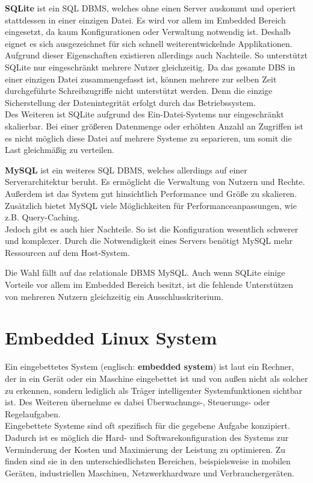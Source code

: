 \textbf{SQLite} ist ein \ac{SQL} \ac{DBMS}, welches ohne einen Server auskommt und operiert stattdessen in einer einzigen Datei. Es wird vor allem im Embedded Bereich eingesetzt, da kaum Konfigurationen oder Verwaltung notwendig ist. Deshalb eignet es sich ausgezeichnet für sich schnell weiterentwickelnde Applikationen.
\\
Aufgrund dieser Eigenschaften existieren allerdings auch Nachteile. So unterstützt SQLite nur eingeschränkt mehrere Nutzer gleichzeitig. Da das gesamte \ac{DBS} in einer einzigen Datei zusammengefasst ist, können mehrere zur selben Zeit durchgeführte Schreibzugriffe nicht unterstützt werden. Denn die einzige Sicherstellung der Datenintegrität erfolgt durch das Betriebssystem. 
\\
Des Weiteren ist SQLite aufgrund des Ein-Datei-Systems nur eingeschränkt skalierbar. Bei einer größeren Datenmenge oder erhöhten Anzahl an Zugriffen ist es nicht möglich diese Datei auf mehrere Systeme zu separieren, um somit die Last gleichmäßig zu verteilen.

\textbf{MySQL} ist ein weiteres \ac{SQL} \ac{DBMS}, welches allerdings auf einer Serverarchitektur beruht. 
Es ermöglicht die Verwaltung von Nutzern und Rechte. Außerdem ist das System gut hinsichtlich Performance und Größe zu skalieren. Zusätzlich bietet MySQL viele Möglichkeiten für Performanceanpassungen, wie z.B. Query-Caching.
\\
Jedoch gibt es auch hier Nachteile. So ist die Konfiguration wesentlich schwerer und komplexer. Durch die Notwendigkeit eines Servers benötigt MySQL mehr Ressourcen auf dem Host-System.

Die Wahl fällt auf das relationale \ac{DBMS} MySQL. Auch wenn SQLite einige Vorteile vor allem im Embedded Bereich besitzt, ist die fehlende Unterstützen von mehreren Nutzern gleichzeitig ein Ausschlusskriterium.

\cite{saake2010datenbanken}

\newpage

\section{Embedded Linux System}
\label{section_EmbeddedLinux}

Ein eingebettetes System (englisch: \textbf{embedded system}) ist laut \cite{bender2005embedded} ein Rechner, der in ein Gerät oder ein Maschine eingebettet ist und von außen nicht als solcher zu erkennen, sondern lediglich als Träger intelligenter Systemfunktionen sichtbar ist. Des Weiteren übernehme es dabei Überwachungs-, Steuerungs- oder Regelaufgaben.\\
Eingebettete Systeme sind oft spezifisch für die gegebene Aufgabe konzipiert. Dadurch ist es möglich die Hard- und Softwarekonfiguration des Systems zur Verminderung der Kosten und Maximierung der Leistung zu optimieren. Zu finden sind sie in den unterschiedlichsten Bereichen, beispielsweise in mobilen Geräten, industriellen Maschinen, Netzwerkhardware und Verbrauchergeräten.\ 

